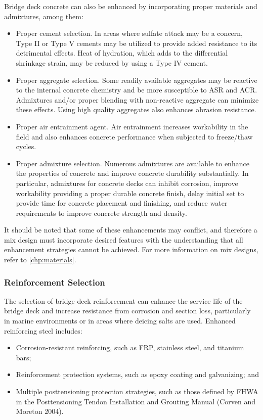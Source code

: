 Bridge deck concrete can also be enhanced by incorporating proper materials and admixtures, among them:
\begin{itemize}
  \item Proper cement selection. In areas where sulfate attack may be a concern, Type II or Type V cements may be utilized to provide added resistance to its detrimental effects. Heat of hydration, which adds to the
  differential shrinkage strain, may be reduced by using a Type IV cement.
  \item Proper aggregate selection. Some readily available aggregates may be reactive to the internal concrete chemistry and be more susceptible to ASR and ACR. Admixtures and/or proper blending with non-reactive
  aggregate can minimize these effects. Using high quality aggregates also enhances abrasion resistance.
  \item Proper air entrainment agent. Air entrainment increases workability in the field and also enhances concrete performance when subjected to freeze/thaw cycles.
  \item Proper admixture selection. Numerous admixtures are available to enhance the properties of concrete and improve concrete durability substantially. In particular, admixtures for concrete decks can inhibit corrosion, improve workability providing a proper durable concrete finish, delay initial set to provide time for concrete placement and finishing, and reduce water requirements to improve concrete strength and density.
\end{itemize}

It should be noted that some of these enhancements may conflict, and therefore a mix design must incorporate desired features with the understanding that all enhancement strategies cannot be achieved. For more information on mix designs, refer to \cref{chp:materials}.

\subsubsection{Reinforcement Selection}
The selection of bridge deck reinforcement can enhance the service life of the bridge deck and increase resistance from corrosion and section loss, particularly in marine environments or in areas where deicing salts are used.  Enhanced reinforcing steel includes:
\begin{itemize}
  \item Corrosion-resistant reinforcing, such as FRP, stainless steel, and titanium bars;
  \item Reinforcement protection systems, such as epoxy coating and galvanizing; and
  \item Multiple posttensioning protection strategies, such as those defined by FHWA in the Posttensioning Tendon Installation and Grouting Manual (Corven and Moreton 2004).
\end{itemize}

